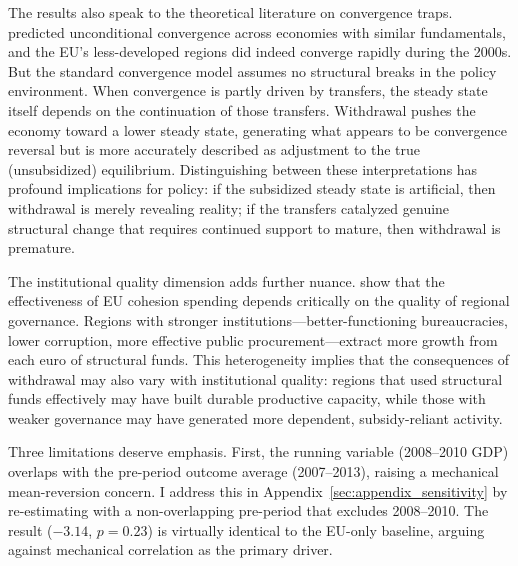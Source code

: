\documentclass[12pt]{article}
\begin{document}
The results also speak to the theoretical literature on convergence traps. \citet{BarroSalaiMartin1992} predicted unconditional convergence across economies with similar fundamentals, and the EU's less-developed regions did indeed converge rapidly during the 2000s. But the standard convergence model assumes no structural breaks in the policy environment. When convergence is partly driven by transfers, the steady state itself depends on the continuation of those transfers. Withdrawal pushes the economy toward a lower steady state, generating what appears to be convergence reversal but is more accurately described as adjustment to the true (unsubsidized) equilibrium. Distinguishing between these interpretations has profound implications for policy: if the subsidized steady state is artificial, then withdrawal is merely revealing reality; if the transfers catalyzed genuine structural change that requires continued support to mature, then withdrawal is premature.

The institutional quality dimension adds further nuance. \citet{RodriguezPoseGarcilazo2015} show that the effectiveness of EU cohesion spending depends critically on the quality of regional governance. Regions with stronger institutions---better-functioning bureaucracies, lower corruption, more effective public procurement---extract more growth from each euro of structural funds. This heterogeneity implies that the consequences of withdrawal may also vary with institutional quality: regions that used structural funds effectively may have built durable productive capacity, while those with weaker governance may have generated more dependent, subsidy-reliant activity.

Three limitations deserve emphasis. First, the running variable (2008--2010 GDP) overlaps with the pre-period outcome average (2007--2013), raising a mechanical mean-reversion concern. I address this in Appendix~\ref{sec:appendix_sensitivity} by re-estimating with a non-overlapping pre-period that excludes 2008--2010. The result ($-3.14$, $p = 0.23$) is virtually identical to the EU-only baseline, arguing against mechanical correlation as the primary driver.
\end{document}
